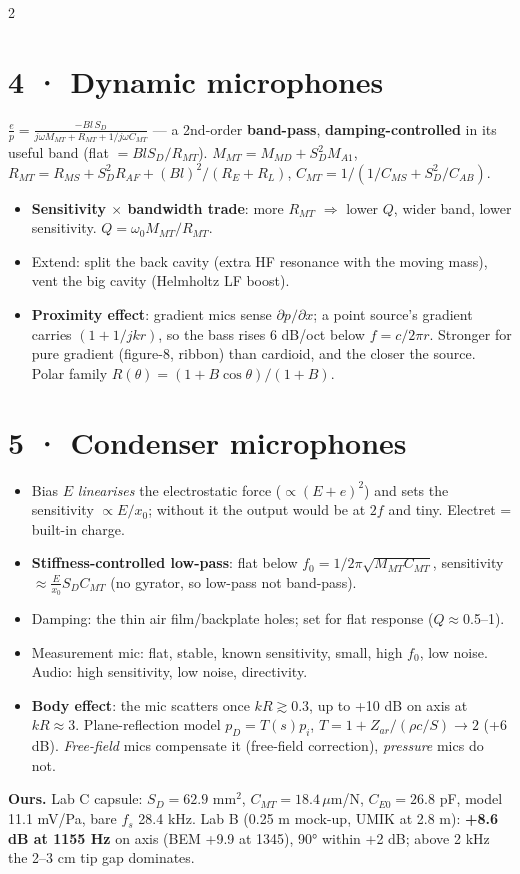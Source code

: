 \documentclass[8pt]{extarticle}
\begin{document}
\begin{multicols}{2}
\section{4 · Dynamic microphones}
$\displaystyle \frac{e}{p}=\frac{-Bl\,S_D}{j\omega M_{MT}+R_{MT}+1/j\omega C_{MT}}$ — a 2nd-order \textbf{band-pass}, \textbf{damping-controlled} in its useful band (flat $=Bl S_D/R_{MT}$).
$M_{MT}=M_{MD}+S_D^2M_{A1}$, $R_{MT}=R_{MS}+S_D^2R_{AF}+(Bl)^2/(R_E+R_L)$, $C_{MT}=1/(1/C_{MS}+S_D^2/C_{AB})$.
\begin{itemize}
\item \textbf{Sensitivity $\times$ bandwidth trade}: more $R_{MT}$ $\Rightarrow$ lower $Q$, wider band, lower sensitivity. $Q=\omega_0M_{MT}/R_{MT}$.
\item Extend: split the back cavity (extra HF resonance with the moving mass), vent the big cavity (Helmholtz LF boost).
\item \textbf{Proximity effect}: gradient mics sense $\partial p/\partial x$; a point source's gradient carries $(1+1/jkr)$, so the bass rises 6 dB/oct below $f=c/2\pi r$. Stronger for pure gradient (figure-8, ribbon) than cardioid, and the closer the source. Polar family $R(\theta)=(1+B\cos\theta)/(1+B)$.
\end{itemize}

\section{5 · Condenser microphones}
\begin{itemize}
\item Bias $E$ \emph{linearises} the electrostatic force ($\propto(E+e)^2$) and sets the sensitivity $\propto E/x_0$; without it the output would be at $2f$ and tiny. Electret = built-in charge.
\item \textbf{Stiffness-controlled low-pass}: flat below $f_0=1/2\pi\sqrt{M_{MT}C_{MT}}$, sensitivity $\approx\frac{E}{x_0}S_D C_{MT}$ (no gyrator, so low-pass not band-pass).
\item Damping: the thin air film/backplate holes; set for flat response ($Q\approx$0.5–1).
\item Measurement mic: flat, stable, known sensitivity, small, high $f_0$, low noise. Audio: high sensitivity, low noise, directivity.
\item \textbf{Body effect}: the mic scatters once $kR\gtrsim0.3$, up to +10 dB on axis at $kR\approx3$. Plane-reflection model $p_D=T(s)p_i$, $T=1+Z_{ar}/(\rho c/S)\to2$ (+6 dB). \emph{Free-field} mics compensate it (free-field correction), \emph{pressure} mics do not.
\end{itemize}
\textbf{Ours.} Lab C capsule: $S_D=62.9$ mm$^2$, $C_{MT}=18.4\,\mu$m/N, $C_{E0}=26.8$ pF, model 11.1 mV/Pa, bare $f_s$ 28.4 kHz. Lab B (0.25 m mock-up, UMIK at 2.8 m): \textbf{+8.6 dB at 1155 Hz} on axis (BEM +9.9 at 1345), 90° within +2 dB; above 2 kHz the 2–3 cm tip gap dominates.


\end{multicols}
\end{document}
